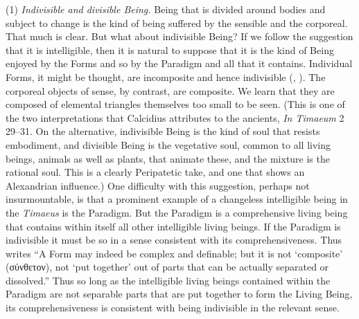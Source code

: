 (1) \emph{Indivisible and divisible Being.} Being that is divided around bodies and subject to change is the kind of being suffered by the sensible and the corporeal. That much is clear. But what about indivisible Being? If we follow the suggestion that it is intelligible, then it is natural to suppose that it is the kind of Being enjoyed by the Forms and so by the Paradigm and all that it contains. Individual Forms, it might be thought, are incomposite and hence indivisible (\citealt[64]{Cornford:1935fk}, \citealt[71]{Robinson:1970lq}). The corporeal objects of sense, by contrast, are composite. We learn that they are composed of elemental triangles themselves too small to be seen. (This is one of the two interpretations that Calcidius attributes to the ancients, \emph{In Timaeum} 2 29--31. On the alternative, indivisible Being is the kind of soul that resists embodiment, and divisible Being is the vegetative soul, common to all living beings, animals as well as plants, that animate these, and the mixture is the rational soul. This is a clearly Peripatetic take, and one that shows an Alexandrian influence.) One difficulty with this suggestion, perhaps not insurmountable, is that a prominent example of a changeless intelligible being in the \emph{Timaeus} is the Paradigm. But the Paradigm is a comprehensive living being that contains within itself all other intelligible living beings. If the Paradigm is indivisible it must be so in a sense consistent with its comprehensiveness. Thus \citet[64]{Cornford:1935fk} writes ``A Form may indeed be complex and definable; but it is not `composite' ({\sbl σύνθετον}), not `put together' out of parts that can be actually separated or dissolved.'' Thus so long as the intelligible living beings contained within the Paradigm are not separable parts that are put together to form the Living Being, its comprehensiveness is consistent with being indivisible in the relevant sense.

